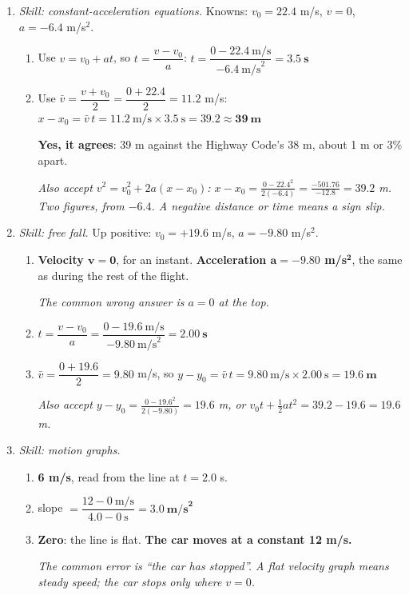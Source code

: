 \documentclass[12pt, twoside]{article}
\begin{document}
\begin{enumerate}[itemsep=0.5cm]
\item \emph{Skill: constant-acceleration equations.} Knowns: $v_0 = 22.4$ m/s,
  $v = 0$, $a = -6.4$ m/s$^2$.
  \begin{enumerate}[itemsep=0.3cm]
    \item Use $v = v_0 + at$, so $t = \dfrac{v - v_0}{a}$:
      \quad $t = \dfrac{0 - 22.4~\text{m/s}}{-6.4~\text{m/s}^2} = \mathbf{3.5~\textbf{s}}$
    \item Use $\bar{v} = \dfrac{v + v_0}{2} = \dfrac{0 + 22.4}{2} = 11.2$ m/s:
      \quad $x - x_0 = \bar{v}\,t = 11.2~\text{m/s} \times 3.5~\text{s} = 39.2
      \approx \mathbf{39~\textbf{m}}$

      \textbf{Yes, it agrees}: 39 m against the Highway Code's 38 m, about 1 m or
      3\% apart.

      \emph{Also accept $v^2 = v_0^2 + 2a(x - x_0)$:
      $x - x_0 = \frac{0 - 22.4^2}{2(-6.4)} = \frac{-501.76}{-12.8} = 39.2$ m. Two
      figures, from $-6.4$. A negative distance or time means a sign slip.}
  \end{enumerate}

\item \emph{Skill: free fall.} Up positive: $v_0 = +19.6$ m/s, $a = -9.80$ m/s$^2$.
  \begin{enumerate}[itemsep=0.3cm]
    \item \textbf{Velocity $\mathbf{v = 0}$}, for an instant. \textbf{Acceleration
      $\mathbf{a = -9.80}$ m/s$^\mathbf{2}$}, the same as during the rest of the
      flight.

      \emph{The common wrong answer is $a = 0$ at the top.}
    \item $t = \dfrac{v - v_0}{a} = \dfrac{0 - 19.6~\text{m/s}}{-9.80~\text{m/s}^2}
      = \mathbf{2.00~\textbf{s}}$
    \item $\bar{v} = \dfrac{0 + 19.6}{2} = 9.80$ m/s, so
      $y - y_0 = \bar{v}\,t = 9.80~\text{m/s} \times 2.00~\text{s} =
      \mathbf{19.6~\textbf{m}}$

      \emph{Also accept $y - y_0 = \frac{0 - 19.6^2}{2(-9.80)} = 19.6$ m, or
      $v_0 t + \frac{1}{2}at^2 = 39.2 - 19.6 = 19.6$ m.}
  \end{enumerate}

\item \emph{Skill: motion graphs.}
  \begin{enumerate}[itemsep=0.3cm]
    \item \textbf{6 m/s}, read from the line at $t = 2.0$ s.
    \item slope $= \dfrac{12 - 0~\text{m/s}}{4.0 - 0~\text{s}} =
      \mathbf{3.0~\textbf{m/s}^\mathbf{2}}$
    \item \textbf{Zero}: the line is flat. \textbf{The car moves at a constant
      12 m/s.}

      \emph{The common error is ``the car has stopped''. A flat velocity graph means
      steady speed; the car stops only where $v = 0$.}
  \end{enumerate}

\end{enumerate}
\end{document}
